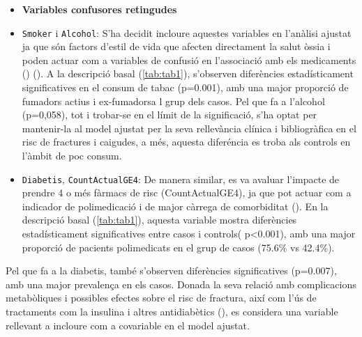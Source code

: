 \documentclass[
]{article}
\begin{document}
\begin{itemize}
\item
  \textbf{Variables confusores retingudes}
\item
  \texttt{Smoker} i \texttt{Alcohol}: S'ha decidit incloure aquestes
  variables en l'anàlisi ajustat ja que són factors d'estil de vida que
  afecten directament la salut òssia i poden actuar com a variables de
  confusió en l'associació amb els medicaments
  ()
  ().
  A la descripció basal (\ref{tab:tab1}), s'observen diferències
  estadísticament significatives en el consum de tabac (p=0.001), amb
  una major proporció de fumadors actius i ex-fumadorsa l grup dels
  casos. Pel que fa a l'alcohol (p=0,058), tot i trobar-se en el límit
  de la significació, s'ha optat per mantenir-la al model ajustat per la
  seva rellevància clínica i bibliogràfica en el risc de fractures i
  caigudes, a més, aquesta diferéncia es troba als controls en l'àmbit
  de poc consum.
\item
  \texttt{Diabetis}, \texttt{CountActualGE4}: De manera similar, es va
  avaluar l'impacte de prendre 4 o més fàrmacs de risc (CountActualGE4),
  ja que pot actuar com a indicador de polimedicació i de major càrrega
  de comorbiditat
  ().
  En la descripció basal (\ref{tab:tab1}), aquesta variable mostra
  diferències estadísticament significatives entre casos i controls(
  p\textless0.001), amb una major proporció de pacients polimedicats en
  el grup de casos (75.6\% vs 42.4\%).
\end{itemize}

Pel que fa a la diabetis, també s'observen diferències significatives
(p=0.007), amb una major prevalença en els casos. Donada la seva relació
amb complicacions metabòliques i possibles efectes sobre el risc de
fractura, així com l'ús de tractaments com la insulina i altres
antidiabètics
(), es
considera una variable rellevant a incloure com a covariable en el model
ajustat.
\end{document}
